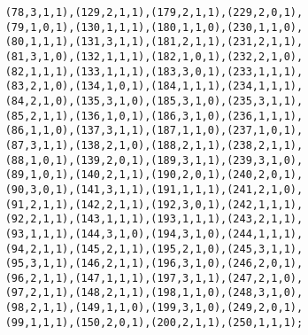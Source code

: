 \documentclass[]{article}
\begin{document}
\begin{verbatim}
    (78,3,1,1),(129,2,1,1),(179,2,1,1),(229,2,0,1),
    (79,1,0,1),(130,1,1,1),(180,1,1,0),(230,1,1,0),
    (80,1,1,1),(131,3,1,1),(181,2,1,1),(231,2,1,1),
    (81,3,1,0),(132,1,1,1),(182,1,0,1),(232,2,1,0),
    (82,1,1,1),(133,1,1,1),(183,3,0,1),(233,1,1,1),
    (83,2,1,0),(134,1,0,1),(184,1,1,1),(234,1,1,1),
    (84,2,1,0),(135,3,1,0),(185,3,1,0),(235,3,1,1),
    (85,2,1,1),(136,1,0,1),(186,3,1,0),(236,1,1,1),
    (86,1,1,0),(137,3,1,1),(187,1,1,0),(237,1,0,1),
    (87,3,1,1),(138,2,1,0),(188,2,1,1),(238,2,1,1),
    (88,1,0,1),(139,2,0,1),(189,3,1,1),(239,3,1,0),
    (89,1,0,1),(140,2,1,1),(190,2,0,1),(240,2,0,1),
    (90,3,0,1),(141,3,1,1),(191,1,1,1),(241,2,1,0),
    (91,2,1,1),(142,2,1,1),(192,3,0,1),(242,1,1,1),
    (92,2,1,1),(143,1,1,1),(193,1,1,1),(243,2,1,1),
    (93,1,1,1),(144,3,1,0),(194,3,1,0),(244,1,1,1),
    (94,2,1,1),(145,2,1,1),(195,2,1,0),(245,3,1,1),
    (95,3,1,1),(146,2,1,1),(196,3,1,0),(246,2,0,1),
    (96,2,1,1),(147,1,1,1),(197,3,1,1),(247,2,1,0),
    (97,2,1,1),(148,2,1,1),(198,1,1,0),(248,3,1,0),
    (98,2,1,1),(149,1,1,0),(199,3,1,0),(249,2,0,1),
    (99,1,1,1),(150,2,0,1),(200,2,1,1),(250,1,1,1);


\end{verbatim}

\newpage
\end{document}
